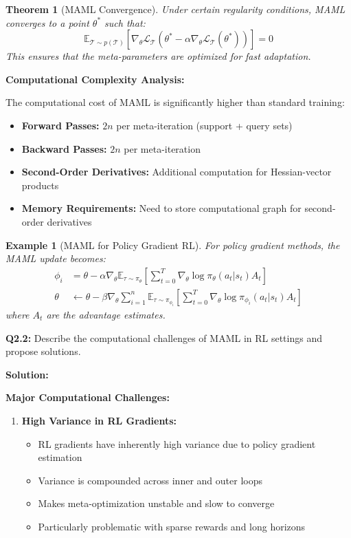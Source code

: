 \documentclass[12pt]{article}
\newcommand{\ieee}[1]{\textcolor{IEEEBlue}{\textbf{#1}}}
\newtheorem{theorem}{Theorem}
\newtheorem{example}{Example}
\begin{document}
{{			\begin{theorem}[MAML Convergence]
			Under certain regularity conditions, MAML converges to a point $\theta^*$ such that:
			\begin{equation}
			\mathbb{E}_{\mathcal{T} \sim p(\mathcal{T})} \left[ \nabla_\theta \mathcal{L}_{\mathcal{T}}(\theta^* - \alpha \nabla_\theta \mathcal{L}_{\mathcal{T}}(\theta^*)) \right] = 0
			\end{equation}
			This ensures that the meta-parameters are optimized for fast adaptation.
			\end{theorem}
			
			\ieee{Computational Complexity Analysis:}
			
			The computational cost of MAML is significantly higher than standard training:
			
			\begin{itemize}
				\item \textbf{Forward Passes:} $2n$ per meta-iteration (support + query sets)
				\item \textbf{Backward Passes:} $2n$ per meta-iteration
				\item \textbf{Second-Order Derivatives:} Additional computation for Hessian-vector products
				\item \textbf{Memory Requirements:} Need to store computational graph for second-order derivatives
			\end{itemize}
			
			\begin{example}[MAML for Policy Gradient RL]
			For policy gradient methods, the MAML update becomes:
			\begin{align}
			\phi_i &= \theta - \alpha \nabla_\theta \mathbb{E}_{\tau \sim \pi_\theta} \left[ \sum_{t=0}^T \nabla_\theta \log \pi_\theta(a_t|s_t) A_t \right] \\
			\theta &\leftarrow \theta - \beta \nabla_\theta \sum_{i=1}^n \mathbb{E}_{\tau \sim \pi_{\phi_i}} \left[ \sum_{t=0}^T \nabla_\theta \log \pi_{\phi_i}(a_t|s_t) A_t \right]
			\end{align}
			where $A_t$ are the advantage estimates.
			\end{example}
			
			\textbf{Q2.2:} Describe the computational challenges of MAML in RL settings and propose solutions.
			
			\textbf{Solution:}
			
			\ieee{Major Computational Challenges:}
			
			\begin{enumerate}
				\item \textbf{High Variance in RL Gradients:}
				\begin{itemize}
					\item RL gradients have inherently high variance due to policy gradient estimation
					\item Variance is compounded across inner and outer loops
					\item Makes meta-optimization unstable and slow to converge
					\item Particularly problematic with sparse rewards and long horizons
				\end{itemize}
				

\end{enumerate}}}
\end{document}
